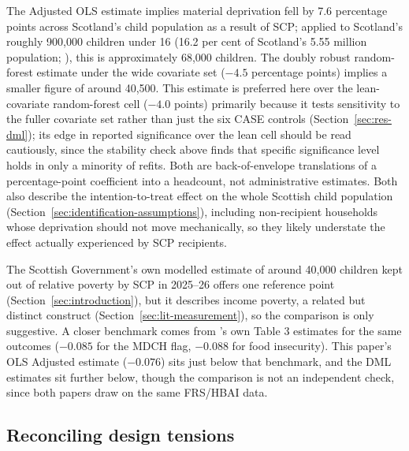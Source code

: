 The Adjusted OLS estimate implies material deprivation fell by 7.6 percentage points across Scotland's child population as a result of SCP; applied to Scotland's roughly 900,000 children under 16 (16.2 per cent of Scotland's 5.55 million population; \citep{nrs2025}), this is approximately 68,000 children. The doubly robust random-forest estimate under the wide covariate set ($-4.5$ percentage points) implies a smaller figure of around 40,500. This estimate is preferred here over the lean-covariate random-forest cell ($-4.0$ points) primarily because it tests sensitivity to the fuller covariate set rather than just the six CASE controls (Section~\ref{sec:res-dml}); its edge in reported significance over the lean cell should be read cautiously, since the stability check above finds that specific significance level holds in only a minority of refits. Both are back-of-envelope translations of a percentage-point coefficient into a headcount, not administrative estimates. Both also describe the intention-to-treat effect on the whole Scottish child population (Section~\ref{sec:identification-assumptions}), including non-recipient households whose deprivation should not move mechanically, so they likely understate the effect actually experienced by SCP recipients.
 
The Scottish Government's own modelled estimate of around 40,000 children kept out of relative poverty by SCP in 2025--26 offers one reference point \citep{scottishgovernment2025} (Section~\ref{sec:introduction}), but it describes income poverty, a related but distinct construct (Section~\ref{sec:lit-measurement}), so the comparison is only suggestive. A closer benchmark comes from \citet{andersen2025}'s own Table 3 estimates for the same outcomes ($-0.085$ for the MDCH flag, $-0.088$ for food insecurity). This paper's OLS Adjusted estimate ($-0.076$) sits just below that benchmark, and the DML estimates sit further below, though the comparison is not an independent check, since both papers draw on the same FRS/HBAI data.
 
\subsection{Reconciling design tensions}
\label{sec:disc-reconciliation}
 
